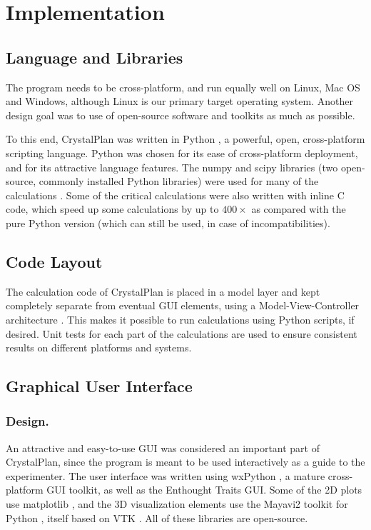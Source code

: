 \documentclass[final]{iucr}              %
\begin{document}
\section{Implementation}




\subsection{Language and Libraries}

The program needs to be cross-platform, and run equally well on Linux, Mac OS
and Windows, although Linux is our primary target operating system. Another
design goal was to use of open-source software and toolkits as much as possible. 

To this end, CrystalPlan was written in Python \cite{python}, a powerful, open,
cross-platform scripting language. Python was chosen for its ease of cross-platform deployment, and for
its attractive language features. The numpy and scipy libraries (two
open-source, commonly installed Python libraries) were used for many of the
calculations \cite{numpy,scipy}. Some of the critical calculations were
also written with inline C code, which speed up some calculations by up to $400\times$ as compared with
the pure Python version (which can still be used, in case of incompatibilities).       

\subsection{Code Layout}

The calculation code of CrystalPlan is placed in a model layer and kept
completely separate from eventual GUI elements, using a Model-View-Controller
architecture \cite{Gamma95}. This makes it possible to run calculations using
Python scripts, if desired. Unit tests for each part of the calculations are used to ensure
consistent results on different platforms and  systems.     
  

\subsection{Graphical User Interface}

\subsubsection{Design.}

An attractive and easy-to-use GUI was considered an important part of
CrystalPlan, since the program is meant to be used interactively as a guide to
the experimenter. The user interface was written using wxPython
\cite{wxPython}, a mature cross-platform GUI toolkit, as well as the Enthought
Traits GUI. Some of the 2D plots use matplotlib \cite{matplotlib},
and the 3D visualization elements use the Mayavi2 toolkit for Python
\cite{mayavi}, itself based on VTK \cite{VTK}. All of these libraries are
open-source.
\end{document}
